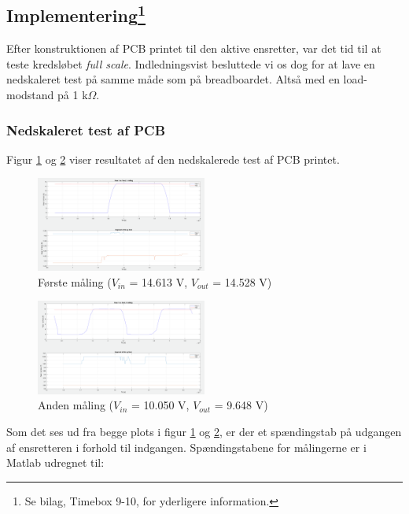 \subsection[Implementering]{Implementering\footnote{Se bilag, Timebox 9-10, for yderligere information.}}
\label{sec:result-bilag-timeb}

Efter konstruktionen af PCB printet til den aktive ensretter, var det tid til at teste kredsløbet \textit{full scale}. Indledningsvist besluttede vi os dog for at lave en nedskaleret test på samme måde som på breadboardet. Altså med en load-modstand på 1 k$\Omega$.

\subsubsection{Nedskaleret test af PCB}
\label{sec:nedskaleret-test-af}

Figur \ref{fig:nt5} og \ref{fig:nt6} viser resultatet af den nedskalerede test af PCB printet.
\clearpage
\begin{figure}[h]
  \centering
  \includegraphics[width=0.5\textwidth]{./figurer/nt5.png}
  \caption{Første måling ($V_{in}$ = 14.613 V, $V_{out}$ = 14.528 V)}
  \label{fig:nt5}
\end{figure}

\begin{figure}[h]
  \centering
  \includegraphics[width=0.5\textwidth]{./figurer/nt6.png}
  \caption{Anden måling ($V_{in}$ = 10.050 V, $V_{out}$ = 9.648 V)}
  \label{fig:nt6}
\end{figure}

Som det ses ud fra begge plots i figur \ref{fig:nt5} og \ref{fig:nt6}, er der et spændingstab på udgangen af ensretteren i forhold til indgangen. Spændingstabene for målingerne er i Matlab udregnet til:


